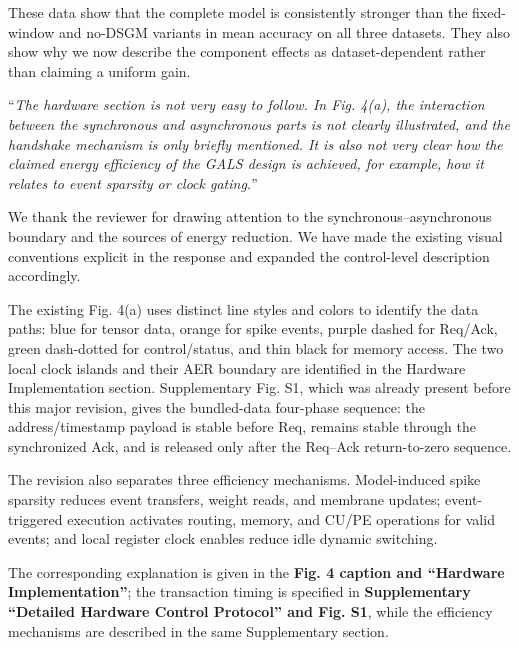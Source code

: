 \documentclass[12pt,technote,onecolumn]{IEEEtran}
\begin{document}
These data show that the complete model is consistently stronger than the
fixed-window and no-DSGM variants in mean accuracy on all three datasets.
They also show why we now describe the component effects as
dataset-dependent rather than claiming a uniform gain.

\vspace{4mm}

``{\it The hardware section is not very easy to follow. In Fig. 4(a), the
interaction between the synchronous and asynchronous parts is not
clearly illustrated, and the handshake mechanism is only briefly
mentioned. It is also not very clear how the claimed energy efficiency
of the GALS design is achieved, for example, how it relates to event
sparsity or clock gating.}''
\vspace{1mm}


We thank the reviewer for drawing attention to the synchronous--asynchronous boundary and the sources of energy reduction. We have made the existing visual conventions explicit in the response and expanded the control-level description accordingly.

The existing Fig. 4(a) uses distinct line styles and colors to identify the data paths:
blue for tensor data, orange for spike events, purple dashed for Req/Ack,
green dash-dotted for control/status, and thin black for memory access.
The two local clock islands and their AER boundary are identified in the
Hardware Implementation section. Supplementary Fig. S1, which was already
present before this major revision, gives the bundled-data four-phase
sequence: the address/timestamp payload is stable before Req, remains
stable through the synchronized Ack, and is released only after the
Req--Ack return-to-zero sequence.

The revision also separates three efficiency mechanisms. Model-induced
spike sparsity reduces event transfers, weight reads, and membrane
updates; event-triggered execution activates routing, memory, and CU/PE
operations for valid events; and local register clock enables reduce
idle dynamic switching.



The corresponding explanation is given in the \textbf{Fig. 4 caption and ``Hardware Implementation''}; the transaction timing is specified in \textbf{Supplementary ``Detailed Hardware Control Protocol'' and Fig. S1}, while the efficiency mechanisms are described in the same Supplementary section.
\end{document}

